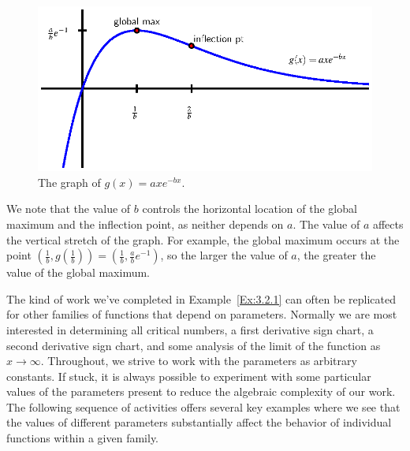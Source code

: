 \begin{figure}[h]
\begin{center}
\includegraphics{figures/3_2_SurgeFam.eps}
\caption{The graph of $g(x) = axe^{-bx}$.} \label{F:3.2.SurgeFam}
\end{center}
\end{figure}

We note that the value of $b$ controls the horizontal location of the global maximum and the inflection point, as neither depends on $a$.  The value of $a$ affects the vertical stretch of the graph.  For example, the global maximum occurs at the point $(\frac{1}{b}, g(\frac{1}{b})) = (\frac{1}{b}, \frac{a}{b}e^{-1})$, so the larger the value of $a$, the greater the value of the global maximum.  

\afterex

The kind of work we've completed in Example~\ref{Ex:3.2.1} can often be replicated for other families of functions that depend on parameters.  Normally we are most interested in determining all critical numbers, a first derivative sign chart, a second derivative sign chart, and some analysis of the limit of the function as $x \to \infty$.  Throughout, we strive to work with the parameters as arbitrary constants.  If stuck, it is always possible to experiment with some particular values of the parameters present to reduce the algebraic complexity of our work.  The following sequence of activities offers several key examples where we see that the values of different parameters substantially affect the behavior of individual functions within a given family.








